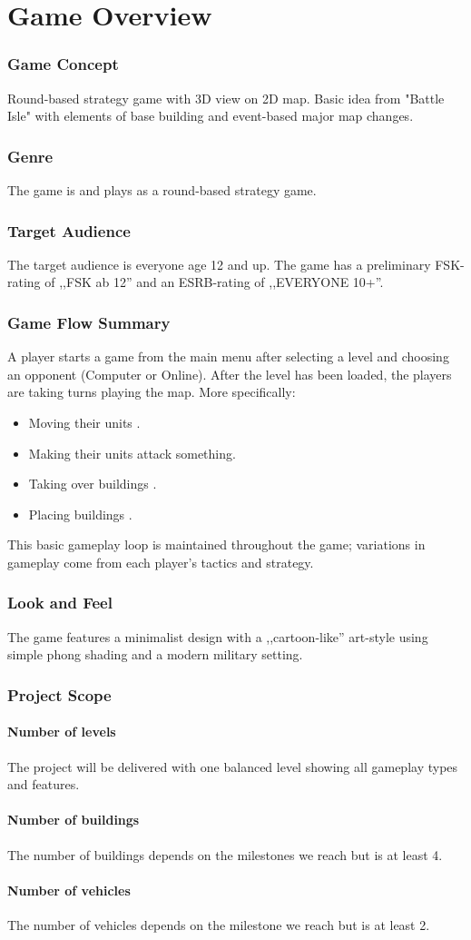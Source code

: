 \part{Game Overview}
\section{Game Concept}
Round-based strategy game with 3D view on 2D map. Basic idea from "Battle Isle" with elements of base building  and
event-based major map changes.
\section{Genre}
The game is and plays as a round-based strategy game.
\section{Target Audience}
The target audience is everyone age 12 and up. The game has a preliminary FSK-rating of ,,FSK ab 12'' and an ESRB-rating of ,,EVERYONE 10+''.
\section{Game Flow Summary}
A player starts a game from the main menu after selecting a level and choosing an opponent (Computer or Online).
After the level has been loaded, the players are taking turns playing the map. More specifically:
\begin{itemize}
    \item Moving their units .
    \item Making their units  attack something.
    \item Taking over buildings .
    \item Placing buildings .
\end{itemize}
This basic gameplay loop is maintained throughout the game; variations in
gameplay come from each player's tactics and strategy.
\section{Look and Feel}
The game features a minimalist design with a ,,cartoon-like'' art-style using simple phong shading and a modern military setting.
\section{Project Scope}
\subsection{Number of levels}
The project will be delivered with one balanced level showing all gameplay types and features.
\subsection{Number of buildings }
The number of buildings  depends on the milestones we reach but is at least 4.
\subsection{Number of vehicles}
The number of vehicles depends on the milestone we reach but is at least 2.
